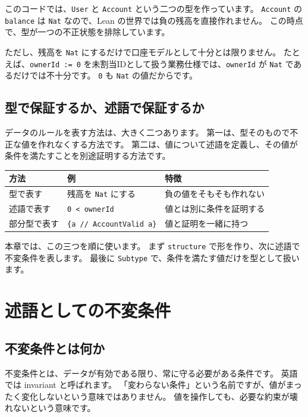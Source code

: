 このコードでは、\texttt{User} と \texttt{Account} という二つの型を作っています。
\texttt{Account} の \texttt{balance} は \texttt{Nat} なので、Lean の世界では負の残高を直接作れません。
この時点で、型が一つの不正状態を排除しています。

ただし、残高を \texttt{Nat} にするだけで口座モデルとして十分とは限りません。
たとえば、\texttt{ownerId := 0} を未割当IDとして扱う業務仕様では、\texttt{ownerId} が \texttt{Nat} であるだけでは不十分です。
\texttt{0} も \texttt{Nat} の値だからです。

\subsection{型で保証するか、述語で保証するか}

データのルールを表す方法は、大きく二つあります。
第一は、型そのもので不正な値を作れなくする方法です。
第二は、値について述語を定義し、その値が条件を満たすことを別途証明する方法です。

\begin{center}
\begin{tabular}{lll}
\toprule
方法 & 例 & 特徴 \\
\midrule
型で表す & 残高を \texttt{Nat} にする & 負の値をそもそも作れない \\
述語で表す & \texttt{0 < ownerId} & 値とは別に条件を証明する \\
部分型で表す & \texttt{\{a // AccountValid a\}} & 値と証明を一緒に持つ \\
\bottomrule
\end{tabular}
\end{center}

本章では、この三つを順に使います。
まず \texttt{structure} で形を作り、次に述語で不変条件を表します。
最後に \texttt{Subtype} で、条件を満たす値だけを型として扱います。

\section{述語としての不変条件}

\subsection{不変条件とは何か}

不変条件とは、データが有効である限り、常に守る必要がある条件です。
英語では invariant と呼ばれます。
「変わらない条件」という名前ですが、値がまったく変化しないという意味ではありません。
値を操作しても、必要な約束が壊れないという意味です。

